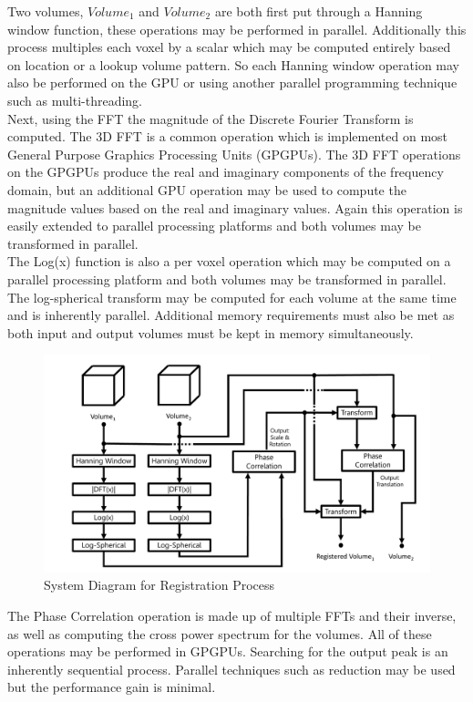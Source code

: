Two volumes, $Volume_1$ and $Volume_2$ are both first put through a Hanning window function, these operations may be performed in parallel. Additionally this process multiples each voxel by a scalar which may be computed entirely based on location or a lookup volume pattern. So each Hanning window operation may also be performed on the GPU or using another parallel programming technique such as multi-threading. \\

Next, using the FFT the magnitude of the Discrete Fourier Transform is computed. The 3D FFT is a common operation which is implemented on most General Purpose Graphics Processing Units (GPGPUs). The 3D FFT operations on the GPGPUs produce the real and imaginary components of the frequency domain, but an additional GPU operation may be used to compute the magnitude values based on the real and imaginary values. Again this operation is easily extended to parallel processing platforms and both volumes may be transformed in parallel. \\

The Log(x) function is also a per voxel operation which may be computed on a parallel processing platform and both volumes may be transformed in parallel. The log-spherical transform may be computed for each volume at the same time and is inherently parallel. Additional memory requirements must also be met as both input and output volumes must be kept in memory simultaneously. \\

\begin{figure}[!htb]
\centering
\includegraphics[width=6.0in]{images/ch2/pipeline2}
\caption{System Diagram for Registration Process}
\label{fig:PIPELINENo1}
\end{figure}


The Phase Correlation operation is made up of multiple FFTs and their inverse, as well as computing the cross power spectrum for the volumes. All of these operations may be performed in GPGPUs. Searching for the output peak is an inherently sequential process. Parallel techniques such as reduction may be used but the performance gain is minimal. \\

